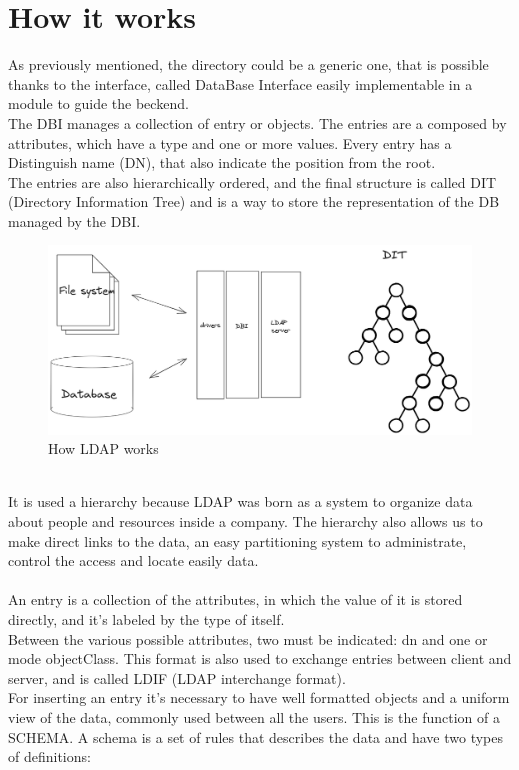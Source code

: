 \section{How it works}
As previously mentioned, the directory could be a generic one, that is possible thanks to the interface, called DataBase Interface easily implementable in a module to guide the beckend. 
\\
The DBI manages a collection of entry or objects. The entries are a composed by attributes, which have a type and one or more values. Every entry has a Distinguish name (DN), that also indicate the position from the root.
\\
The entries are also hierarchically ordered, and the final structure is called DIT (Directory Information Tree) and is a way to store the representation of the DB managed by the DBI.
\begin{figure}[h]
    \caption{How LDAP works}
    \centering
    \includegraphics[width=15cm]{img/arch.png}
\end{figure}
\\
It is used a hierarchy because LDAP was born as a system to organize data about people and resources inside a company. The hierarchy also allows us to make direct links to the data, an easy partitioning system to administrate, control the access and locate easily data. 
\\\\
An entry is a collection of the attributes, in which the value of it is stored directly, and it’s labeled by the type of itself.
\\
Between the various possible attributes, two must be indicated: dn and one or mode objectClass. This format is also used to exchange entries between client and server, and is called LDIF (LDAP interchange format). 
\\
For inserting an entry it’s necessary to have well formatted objects and a uniform view of the data, commonly used between all the users. This is the function of a SCHEMA. A schema is a set of rules that describes the data and have two types of definitions: 
